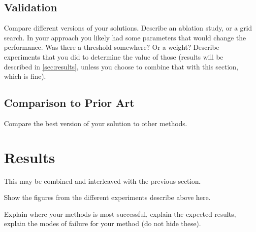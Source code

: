 \subsection{Validation}
Compare different versions of your solutions. Describe an ablation study, or a grid search.  In your approach you likely had some parameters that would change the performance. Was there a threshold somewhere? Or a weight? Describe experiments that you did to determine the value of those (results will be described in \autoref{sec:results},  unless you choose to combine that with this section, which is fine).

\subsection{Comparison to Prior Art}

Compare the best version of your solution to other methods.


\section{Results}
\label{sec:results}
This may be combined and interleaved with the previous section.

Show the figures from the different experiments describe above here.

Explain where your methods is most successful, explain the expected results, explain the modes of failure for your method (do not hide these).




